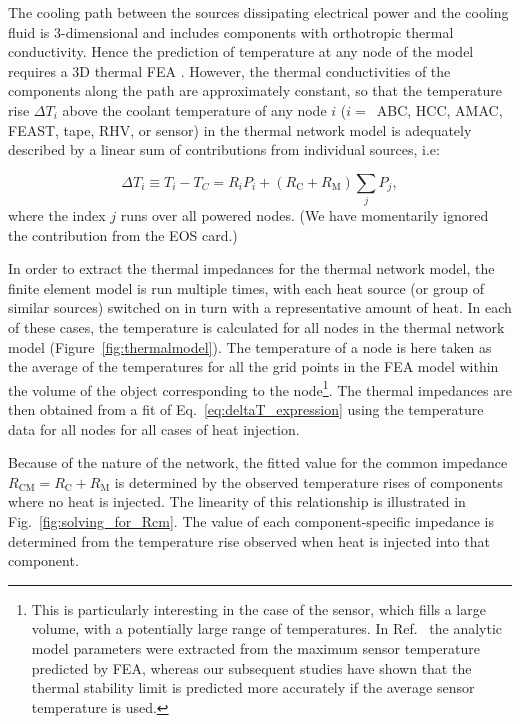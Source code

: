 \label{sec:impedances}

The cooling path between the sources dissipating electrical power and the cooling fluid is 3-dimensional and includes components with orthotropic thermal conductivity. Hence the prediction of temperature at any node of the model requires a 3D thermal FEA \cite{abaqus,ansys}. However, the thermal conductivities of the components along the path are approximately constant, so that the temperature rise $\Delta T_i$ above the coolant temperature of any node $i$ ($i=$~ABC, HCC, AMAC, FEAST, tape, RHV, or sensor) in the thermal network model is adequately described by a linear sum of contributions from individual sources, i.e:

\begin{equation}
\Delta T_i \equiv T_i - T_C = R_i P_i + \left(R_\text{C} + R_\text{M}\right)\sum_j P_j,
\label{eq:deltaT_expression}
\end{equation}
where the index $j$ runs over all powered nodes. (We have momentarily ignored the contribution from the EOS card.)

In order to extract the thermal impedances for the thermal network model, the finite element model is run multiple times, with each heat source (or group of similar sources) switched on in turn with a representative amount of heat. In each of these cases, the temperature is calculated for all nodes in the thermal network model (Figure~\ref{fig:thermalmodel}). The temperature of a node is here taken as the average of the temperatures for all the grid points in the FEA model within the volume of the object corresponding to the node\footnote{This is particularly interesting in the case of the sensor, which fills a large volume, with a potentially large range of temperatures. In Ref.~\cite{Beck:2010zzd} the analytic model parameters were extracted from the maximum sensor temperature predicted by FEA, whereas our subsequent studies have shown that the thermal stability limit is predicted more accurately if the average sensor temperature is used.}. The thermal impedances are then obtained from a fit of Eq.~\ref{eq:deltaT_expression} using the temperature data for all nodes for all cases of heat injection.

Because of the nature of the network, the fitted value for the common impedance $R_\text{CM}=R_\text{C} + R_\text{M}$ is determined by the observed temperature rises of components where no heat is injected. The linearity of this relationship is illustrated in Fig.~\ref{fig:solving_for_Rcm}. The value of each component-specific impedance is determined from the temperature rise observed when heat is injected into that component.

